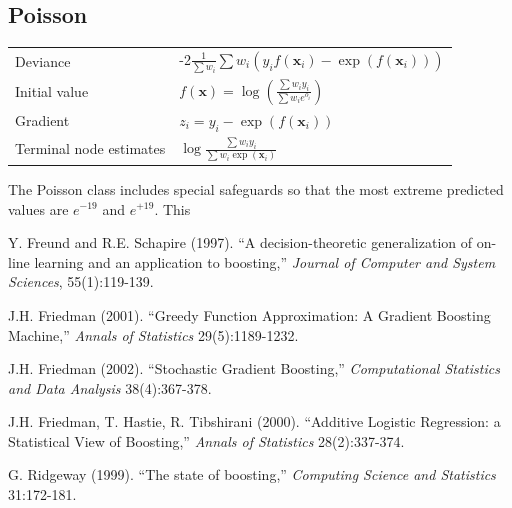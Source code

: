 \documentclass{article}
\begin{document}
\subsection{Poisson}
\begin{tabular}{ll}
Deviance & -2$\frac{1}{\sum w_i} \sum w_i(y_if(\mathbf{x}_i)-\exp(f(\mathbf{x}_i)))$ \\
Initial value & $\displaystyle f(\mathbf{x})= \log\left(\frac{\sum w_iy_i}{\sum w_ie^{o_i}}\right)$ \\
Gradient & $z_i=y_i - \exp(f(\mathbf{x}_i))$ \\
Terminal node estimates & $\displaystyle \log\frac{\sum w_iy_i}{\sum w_i\exp(\mathbf{x}_i)}$
\end{tabular}

The Poisson class includes special safeguards so that the most extreme predicted values are $e^{-19}$ and $e^{+19}$. This

\begin{thebibliography}{77}     %

\small                          %

Y. Freund and R.E. Schapire (1997). ``A decision-theoretic generalization of
on-line learning and an application to boosting,'' \textit{Journal of Computer and System Sciences}, 55(1):119-139.

J.H. Friedman (2001). ``Greedy Function Approximation: A Gradient Boosting
Machine,'' \textit{Annals of Statistics} 29(5):1189-1232.

J.H. Friedman (2002). ``Stochastic Gradient Boosting,'' \textit{Computational Statistics
and Data Analysis} 38(4):367-378.

J.H. Friedman, T. Hastie, R. Tibshirani (2000). ``Additive Logistic Regression:
a Statistical View of Boosting,'' \textit{Annals of Statistics} 28(2):337-374.

G. Ridgeway (1999). ``The state of boosting,'' \textit{Computing Science and Statistics}
31:172-181.

\end{thebibliography}           %
\end{document}
